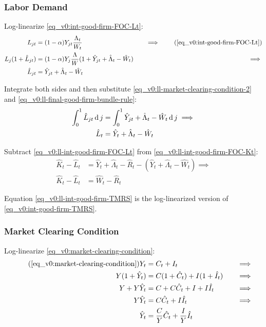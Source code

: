 \documentclass[
thesis.tex
]{subfiles}
\begin{document}
	
	\subsubsection*{Labor Demand}
	
	Log-linearize \ref{eq_v0:int-good-firm-FOC-Lt}:
	\begin{alignat}{2}
		L_{jt} &= (1-\alpha) Y_{jt} \frac{\Lambda_t}{W_t} &\implies \tag{\ref{eq_v0:int-good-firm-FOC-Lt}} \\
		L_j (1+ \hat{L}_{jt}) &= (1-\alpha) Y_{j} \frac{\Lambda}{W} (1+ \hat{Y}_{jt} +\hat{\Lambda}_t -\hat{W}_t) \quad &\implies \nonumber \\
		\hat{L}_{jt} &= \hat{Y}_{jt} +\hat{\Lambda}_t -\hat{W}_t \nonumber
	\end{alignat}
	
	Integrate both sides and then substitute \ref{eq_v0:ll-market-clearing-condition-2} and \ref{eq_v0:ll-final-good-firm-bundle-rule}:
	\begin{align}
		\int_{0}^{1} \hat{L}_{jt} \operatorname{d} j &= \int_{0}^{1} \hat{Y}_{jt} + \hat{\Lambda}_t - \hat{W}_t \operatorname{d} j \implies \nonumber \\
		\hat{L}_t &= \hat{Y}_t + \hat{\Lambda}_t - \hat{W}_t
		\label{eq_v0:ll-int-good-firm-FOC-Lt}
	\end{align}
	
	Subtract \ref{eq_v0:ll-int-good-firm-FOC-Lt} from \ref{eq_v0:ll-int-good-firm-FOC-Kt}:
	\begin{align}
		\hat{K}_t - \hat{L}_t &= \hat{Y}_t + \hat{\Lambda}_t - \hat{R}_t - (\hat{Y}_t + \hat{\Lambda}_t - \hat{W}_t) \implies \nonumber \\
		\hat{K}_t - \hat{L}_t &= \hat{W}_t - \hat{R}_t \label{eq_v0:ll-int-good-firm-TMRS}
	\end{align}
	
	Equation \ref{eq_v0:ll-int-good-firm-TMRS} is the log-linearized version of \ref{eq_v0:int-good-firm-TMRS}.
	
	
	\subsubsection*{Market Clearing Condition}
	
	Log-linearize \ref{eq_v0:market-clearing-condition}:
	\begin{alignat}{2}
		\tag{\ref{eq_v0:market-clearing-condition}}
		Y_t &= C_t + I_t &\implies \\
		Y (1+ \hat{Y}_t) &= C(1+ \hat{C}_t) + I (1+ \hat{I}_t) \quad &\implies \nonumber \\
		Y + Y\hat{Y}_t &= C + C\hat{C}_t + I + I\hat{I}_t &\implies \nonumber  \\
		Y\hat{Y}_t &= C\hat{C}_t + I\hat{I}_t &\implies \nonumber \\
		\hat{Y}_t &= \frac{C}{Y}\hat{C}_t + \frac{I}{Y}\hat{I}_t  \label{eq_v0:ll-market-clearing-condition}
	\end{alignat}
	
\end{document}
